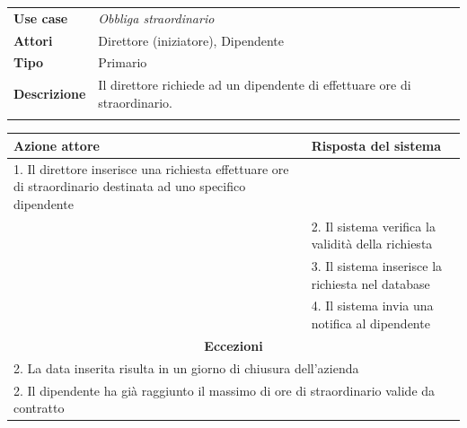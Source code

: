 \documentclass{scrreprt}
\begin{document}
	\FloatBarrier
	\begin{table}[h|]
	\centering
	\begin{tabular}{p{3cm}p{11cm}}
	\textbf{Use case} & \textit{Obbliga straordinario} \\ 
	\textbf{Attori} & Direttore (iniziatore), Dipendente \\
	\textbf{Tipo} & Primario \\
	\textbf{Descrizione} & Il direttore richiede ad un dipendente di effettuare ore di straordinario. \\
	\\
	\end{tabular}
	\centering
	\begin{tabular}{|p{7cm}|p{7cm}|}
	\hline
	\textbf{Azione attore} & \textbf{Risposta del sistema} \\ \hline
	1. Il direttore inserisce una richiesta effettuare ore di straordinario destinata ad uno specifico dipendente &                  \\ \hline
	& 2. Il sistema verifica la validità della richiesta                  \\ \hline
	& 3. Il sistema inserisce la richiesta nel database                  \\ \hline
	& 4. Il sistema invia una notifica al dipendente                  \\ \hline
	\multicolumn{2}{|c|}{\textbf{Eccezioni}} \\ \hline
	\multicolumn{2}{|l|}{ 2. La data inserita risulta in un giorno di chiusura dell'azienda } \\ \hline
	\multicolumn{2}{|l|}{ 2. Il dipendente ha già raggiunto il massimo di ore di straordinario valide da contratto } \\ \hline
	\end{tabular}
	\end{table}
	\FloatBarrier
	
\end{document}
